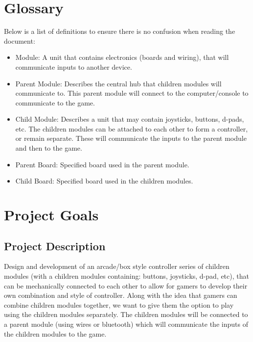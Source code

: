 \documentclass[a4]{article}
\begin{document}
\section{Glossary}
Below is a list of definitions to ensure there is no confusion when reading the document:
\begin{itemize}
	\item \textcolor{McMasterMaroon}{Module}: A unit that contains electronics (boards and wiring), that will communicate inputs to another device.
	\item \textcolor{McMasterMaroon}{Parent Module}: Describes the central hub that children modules will communicate to. This parent module will connect to the computer/console to communicate to the game.
	\item \textcolor{McMasterMaroon}{Child Module}: Describes a unit that may contain joysticks, buttons, d-pads, etc. The children modules can be attached to each other to form a controller, or remain separate. These will communicate the inputs to the parent module and then to the game.
	\item \textcolor{McMasterMaroon}{Parent Board}: Specified board used in the parent module.
	\item \textcolor{McMasterMaroon}{Child Board}: Specified board used in the children modules.
\end{itemize}
\section{Project Goals}
\subsection{Project Description}
Design and development of an arcade/box style controller series of children modules (with a children modules containing: buttons, joysticks, d-pad, etc), that can be mechanically
connected to each other to allow for gamers to develop their own combination and style of controller. Along with the idea that gamers can combine children modules together,
we want to give them the option to play using the children modules separately. The children modules will be connected to a parent module (using wires or bluetooth) which will communicate the inputs of the
children modules to the game. 
\end{document}
